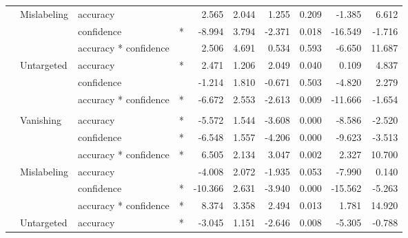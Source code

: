 \documentclass[
]{article}
\begin{document}
\begin{longtable}[t]{llllrrrrrr}
\hspace{1em} & Mislabeling & accuracy &  & 2.565 & 2.044 & 1.255 & 0.209 & -1.385 & 6.612\\
\cmidrule{3-10}\nopagebreak
\hspace{1em} &  & confidence & * & -8.994 & 3.794 & -2.371 & 0.018 & -16.549 & -1.716\\
\cmidrule{3-10}\nopagebreak
\hspace{1em} &  & accuracy * confidence &  & 2.506 & 4.691 & 0.534 & 0.593 & -6.650 & 11.687\\
\cmidrule{2-10}\nopagebreak
\hspace{1em} & Untargeted & accuracy & * & 2.471 & 1.206 & 2.049 & 0.040 & 0.109 & 4.837\\
\cmidrule{3-10}\nopagebreak
\hspace{1em} &  & confidence &  & -1.214 & 1.810 & -0.671 & 0.503 & -4.820 & 2.279\\
\cmidrule{3-10}\nopagebreak
\hspace{1em} &  & accuracy * confidence & * & -6.672 & 2.553 & -2.613 & 0.009 & -11.666 & -1.654\\
\cmidrule{1-10}\pagebreak[0]
\addlinespace[0.3em]
\multicolumn{10}{l}{\textbf{Faster R-CNN}}\\
\hspace{1em} & Vanishing & accuracy & * & -5.572 & 1.544 & -3.608 & 0.000 & -8.586 & -2.520\\
\cmidrule{3-10}\nopagebreak
\hspace{1em} &  & confidence & * & -6.548 & 1.557 & -4.206 & 0.000 & -9.623 & -3.513\\
\cmidrule{3-10}\nopagebreak
\hspace{1em} &  & accuracy * confidence & * & 6.505 & 2.134 & 3.047 & 0.002 & 2.327 & 10.700\\
\cmidrule{2-10}\nopagebreak
\hspace{1em} & Mislabeling & accuracy &  & -4.008 & 2.072 & -1.935 & 0.053 & -7.990 & 0.140\\
\cmidrule{3-10}\nopagebreak
\hspace{1em} &  & confidence & * & -10.366 & 2.631 & -3.940 & 0.000 & -15.562 & -5.263\\
\cmidrule{3-10}\nopagebreak
\hspace{1em} &  & accuracy * confidence & * & 8.374 & 3.358 & 2.494 & 0.013 & 1.781 & 14.920\\
\cmidrule{2-10}\nopagebreak
\hspace{1em} & Untargeted & accuracy & * & -3.045 & 1.151 & -2.646 & 0.008 & -5.305 & -0.788\\

\end{longtable}
\end{document}
